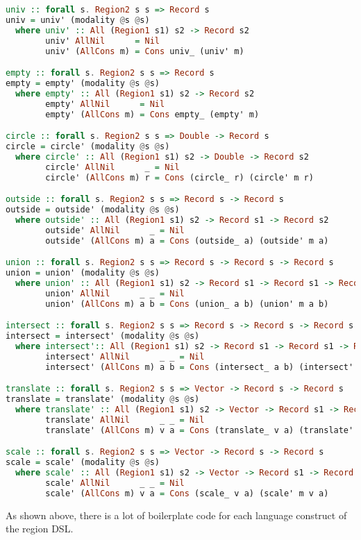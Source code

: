 \begin{lstlisting}[language=Haskell,deletekeywords={union,intersect}]
univ :: forall s. Region2 s s => Record s
univ = univ' (modality @s @s)
  where univ' :: All (Region1 s1) s2 -> Record s2
        univ' AllNil      = Nil
        univ' (AllCons m) = Cons univ_ (univ' m)

empty :: forall s. Region2 s s => Record s
empty = empty' (modality @s @s)
  where empty' :: All (Region1 s1) s2 -> Record s2
        empty' AllNil      = Nil
        empty' (AllCons m) = Cons empty_ (empty' m)

circle :: forall s. Region2 s s => Double -> Record s
circle = circle' (modality @s @s)
  where circle' :: All (Region1 s1) s2 -> Double -> Record s2
        circle' AllNil      _ = Nil
        circle' (AllCons m) r = Cons (circle_ r) (circle' m r)

outside :: forall s. Region2 s s => Record s -> Record s
outside = outside' (modality @s @s)
  where outside' :: All (Region1 s1) s2 -> Record s1 -> Record s2
        outside' AllNil      _ = Nil
        outside' (AllCons m) a = Cons (outside_ a) (outside' m a)

union :: forall s. Region2 s s => Record s -> Record s -> Record s
union = union' (modality @s @s)
  where union' :: All (Region1 s1) s2 -> Record s1 -> Record s1 -> Record s2
        union' AllNil      _ _ = Nil
        union' (AllCons m) a b = Cons (union_ a b) (union' m a b)

intersect :: forall s. Region2 s s => Record s -> Record s -> Record s
intersect = intersect' (modality @s @s)
  where intersect':: All (Region1 s1) s2 -> Record s1 -> Record s1 -> Record s2
        intersect' AllNil      _ _ = Nil
        intersect' (AllCons m) a b = Cons (intersect_ a b) (intersect' m a b)

translate :: forall s. Region2 s s => Vector -> Record s -> Record s
translate = translate' (modality @s @s)
  where translate' :: All (Region1 s1) s2 -> Vector -> Record s1 -> Record s2
        translate' AllNil      _ _ = Nil
        translate' (AllCons m) v a = Cons (translate_ v a) (translate' m v a)

scale :: forall s. Region2 s s => Vector -> Record s -> Record s
scale = scale' (modality @s @s)
  where scale' :: All (Region1 s1) s2 -> Vector -> Record s1 -> Record s2
        scale' AllNil      _ _ = Nil
        scale' (AllCons m) v a = Cons (scale_ v a) (scale' m v a)
\end{lstlisting}
\noindent
As shown above, there is a lot of boilerplate code for each language
construct of the region DSL.

